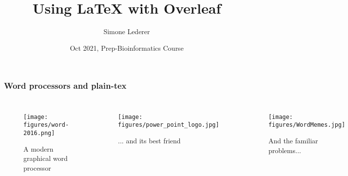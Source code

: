 \documentclass{beamer}
\title[Basic \LaTeX{}]{Using \LaTeX{} with Overleaf}
\author{Simone Lederer}
\institute[]
{Algorithms in Bioinformatics, ZBIT\\
  University of T\"{u}bingen
}
\date[Vorkurs WiSe 2020/21]{Oct 2021, Prep-Bioinformatics Course}
\begin{document}
\frame{\titlepage}

\begin{frame} %
\frametitle{Word processors and plain-tex}
\begin{columns}
    \begin{figure}
        \caption{A modern graphical word processor}
        \texttt{[image: figures/word-2016.png]}
    \end{figure}
    \begin{figure}
        \caption{... and its best friend}
        \texttt{[image: figures/power\_point\_logo.jpg]}
    \end{figure}
    \begin{figure}
        \caption{And the familiar problems...}
        \texttt{[image: figures/WordMemes.jpg]}
    \end{figure}
\end{columns}
\end{frame}
\end{document}
